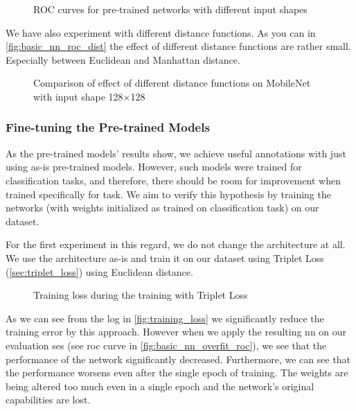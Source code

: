 \begin{figure}
    \centering
    \def\svgwidth{\columnwidth}
    
    \caption{ROC curves for pre-trained networks with different input shapes}
    \label{fig:pretrained_nn_roc}
\end{figure}

We have also experiment with different distance functions. As you can in \autoref{fig:basic_nn_roc_dist} the effect of different distance functions are rather small. Especially between Euclidean and Manhattan distance.

\begin{figure}
    \centering
    \def\svgwidth{\columnwidth}
    
    \caption{Comparison of effect of different distance functions on MobileNet with input shape 128$\times$128}
    \label{fig:basic_nn_roc_dist}
\end{figure}

\subsubsection{Fine-tuning the Pre-trained Models}

As the pre-trained models' results show, we achieve useful annotations with just using as-is pre-trained models. However, such models were trained for classification tasks, and therefore, there should be room for improvement when trained specifically for \reid{} task. We aim to verify this hypothesis by training the networks (with weights initialized as trained on classification task) on our dataset.

For the first experiment in this regard, we do not change the architecture at all. We use the architecture as-is and train it on our dataset using Triplet Loss (\autoref{sec:triplet_loss}) using Euclidean distance.

\begin{figure}
    \centering
    \def\svgwidth{\columnwidth}
    \large
    \scalebox{0.8}{}
    \caption{Training loss during the training with Triplet Loss}
    \label{fig:training_loss}
\end{figure}

As we can see from the log in \autoref{fig:training_loss} we significantly reduce the training error by this approach. However when we apply the resulting \gls{nn} on our evaluation \gls{ses} (see \gls{roc} curve in \autoref{fig:basic_nn_overfit_roc}), we see that the performance of the network significantly decreased. Furthermore, we can see that the performance worsens even after the single epoch of training. The weights are being altered too much even in a single epoch and the network's original capabilities are lost.

